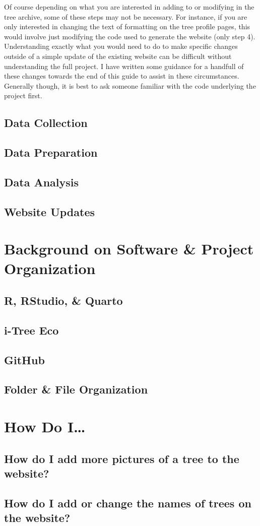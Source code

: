 \documentclass[11pt]{article}
\begin{document}
Of course depending on what you are interested in adding to or modifying in the tree archive, some of these steps may not be necessary. For instance, if you are only interested in changing the text of formatting on the tree profile pages, this would involve just modifying the code used to generate the website (only step 4). Understanding exactly what you would need to do to make specific changes outside of a simple update of the existing website can be difficult without understanding the full project. I have written some guidance for a handfull of these changes towards the end of this guide to assist in these circumstances. Generally though, it is best to ask someone familiar with the code underlying the project first.

\subsection{Data Collection}

\subsection{Data Preparation}

\subsection{Data Analysis}

\subsection{Website Updates}

\section{Background on Software \& Project Organization}

\subsection{R, RStudio, \& Quarto}

\subsection{i-Tree Eco}

\subsection{GitHub}

\subsection{Folder \& File Organization}


\section{How Do I\ldots}

\subsection{How do I add more pictures of a tree to the website?}

\subsection{How do I add or change the names of trees on the website?}
\end{document}
